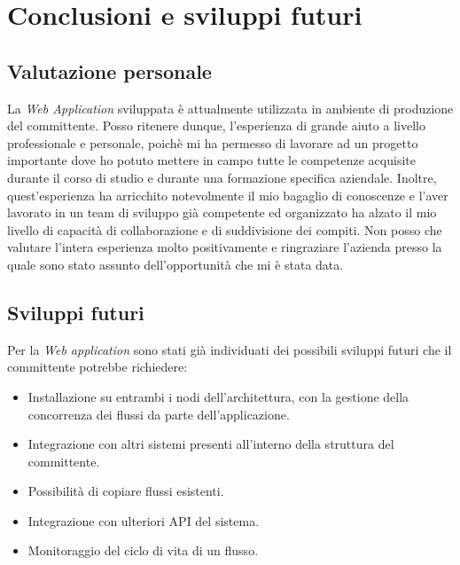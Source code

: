 \chapter{Conclusioni e sviluppi futuri}
\label{chap:conclusioni}

\section{Valutazione personale}
La \textit{Web Application} sviluppata è attualmente utilizzata in ambiente di produzione del committente. Posso ritenere dunque, l'esperienza di grande aiuto a livello professionale e personale, poichè mi ha permesso di lavorare ad un progetto importante dove ho potuto mettere in campo tutte le competenze acquisite durante il corso di studio e durante una formazione specifica aziendale. Inoltre, quest'esperienza ha arricchito notevolmente il mio bagaglio di conoscenze e l'aver lavorato in un team di sviluppo già competente ed organizzato ha alzato il mio livello di capacità di collaborazione e di suddivisione dei compiti. Non posso che valutare l'intera esperienza molto positivamente e ringraziare l'azienda presso la quale sono stato assunto dell'opportunità che mi è stata data.



\section{Sviluppi futuri}

Per la \textit{Web application} sono stati già individuati dei possibili sviluppi futuri che il committente potrebbe richiedere:
\begin{itemize}
    \item Installazione su entrambi i nodi dell'architettura, con la gestione della concorrenza dei flussi da parte dell'applicazione.
    \item Integrazione con altri sistemi presenti all'interno della struttura del committente.
    \item Possibilità di copiare flussi esistenti.
    \item Integrazione con ulteriori \gls{API} del sistema.
    \item Monitoraggio del ciclo di vita di un flusso.
\end{itemize}
